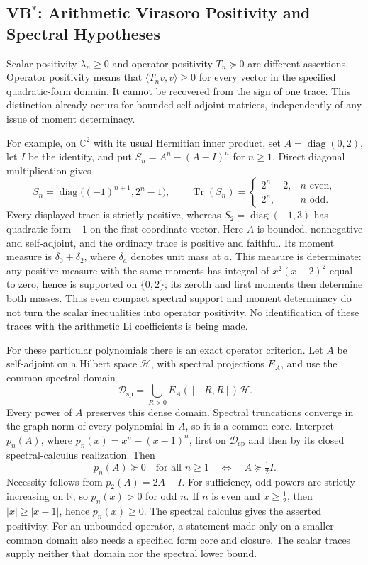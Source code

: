 \subsection{\texorpdfstring{VB\(^{*}\)}{VB*}: Arithmetic Virasoro Positivity and Spectral Hypotheses}

Scalar positivity \(\lambda_n\ge0\) and operator positivity
\(T_n\succeq0\) are different assertions. Operator positivity means
that \(\langle T_nv,v\rangle\ge0\) for every vector in the specified
quadratic-form domain. It cannot be recovered from the sign of one
trace. This distinction already occurs for bounded self-adjoint
matrices, independently of any issue of moment determinacy.

For example, on \(\mathbb C^2\) with its usual Hermitian inner product,
set \(A=\operatorname{diag}(0,2)\), let \(I\) be the identity, and put
\(S_n=A^n-(A-I)^n\) for \(n\ge1\). Direct diagonal multiplication gives
\[
 S_n=\operatorname{diag}\bigl((-1)^{n+1},2^n-1\bigr),\qquad
 \operatorname{Tr}(S_n)=
 \begin{cases}
  2^n-2,&n\text{ even},\\
  2^n,&n\text{ odd}.
 \end{cases}
\]
Every displayed trace is strictly positive, whereas
\(S_2=\operatorname{diag}(-1,3)\) has quadratic form \(-1\) on the
first coordinate vector. Here \(A\) is bounded, nonnegative and
self-adjoint, and the ordinary trace is positive and faithful.
Its moment measure is \(\delta_0+\delta_2\), where \(\delta_a\)
denotes unit mass at \(a\). This measure is determinate: any positive
measure with the same moments has integral of \(x^2(x-2)^2\) equal
to zero, hence is supported on \(\{0,2\}\); its zeroth and first
moments then determine both masses. Thus even compact spectral
support and moment determinacy do not turn the scalar inequalities
into operator positivity. No identification of these traces with the
arithmetic Li coefficients is being made.

For these particular polynomials there is an exact operator criterion.
Let \(A\) be self-adjoint on a Hilbert space \(\mathcal H\), with
spectral projections \(E_A\), and use the common spectral domain
\[
 \mathcal D_{\mathrm{sp}}
 =\bigcup_{R>0}E_A([-R,R])\mathcal H.
\]
Every power of \(A\) preserves this dense domain. Spectral truncations
converge in the graph norm of every polynomial in \(A\), so it is a
common core. Interpret \(p_n(A)\), where
\(p_n(x)=x^n-(x-1)^n\), first on \(\mathcal D_{\mathrm{sp}}\) and then
by its closed spectral-calculus realization. Then
\[
 p_n(A)\succeq0\quad\text{for all }n\ge1
 \quad\Longleftrightarrow\quad A\succeq\tfrac12 I.
\]
Necessity follows from \(p_2(A)=2A-I\). For sufficiency, odd powers
are strictly increasing on \(\mathbb R\), so \(p_n(x)>0\) for odd
\(n\). If \(n\) is even and \(x\ge\tfrac12\), then
\(|x|\ge|x-1|\), hence \(p_n(x)\ge0\). The spectral calculus gives
the asserted positivity. For an unbounded operator, a statement made
only on a smaller common domain also needs a specified form core
and closure. The scalar traces supply neither that domain nor the
spectral lower bound.

